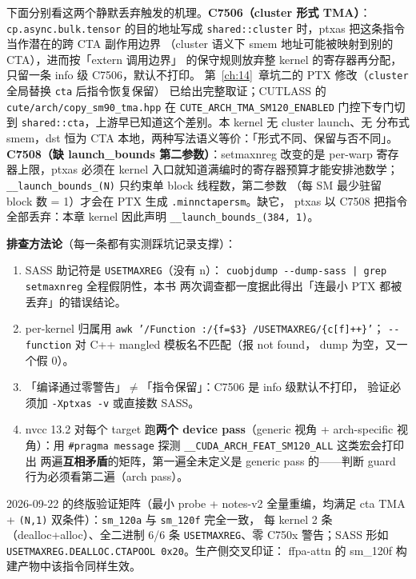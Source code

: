 下面分别看这两个静默丢弃触发的机理。\textbf{C7506（cluster 形式 TMA）}：
\texttt{cp.\allowbreak{}async.\allowbreak{}bulk.\allowbreak{}tensor} 的目的地址写成
\texttt{shared::cluster} 时，ptxas 把这条指令当作潜在的跨 CTA 副作用边界
（cluster 语义下 smem 地址可能被映射到别的 CTA），进而按「extern 调用边界」
的保守规则放弃整 kernel 的寄存器再分配，只留一条 info 级 C7506，默认不打印。
第~\ref{ch:14}~章坑二的 PTX 修改（\texttt{cluster} 全局替换 \texttt{cta} 后指令恢复保留）
已给出完整取证；CUTLASS 的 \texttt{cute/arch/copy\_sm90\_tma.hpp} 在
\texttt{CUTE\_\allowbreak{}ARCH\_\allowbreak{}TMA\_\allowbreak{}SM120\_\allowbreak{}ENABLED} 门控下专门切到
\texttt{shared::cta}，上游早已知道这个差别。本 kernel 无 cluster launch、无
分布式 smem，dst 恒为 CTA 本地，两种写法语义等价：「形式不同、保留与否不同」。
\textbf{C7508（缺 launch\_bounds 第二参数）}：setmaxnreg 改变的是 per-warp
寄存器上限，ptxas 必须在 kernel 入口就知道满编时的寄存器预算才能安排池数学；
\texttt{\_\_launch\_\allowbreak{}bounds\_\allowbreak{}(N)} 只约束单 block 线程数，第二参数
（每 SM 最少驻留 block 数 = 1）才会在 PTX 生成 \texttt{.minnctapersm}。缺它，
ptxas 以 C7508 把指令全部丢弃：本章 kernel 因此声明
\texttt{\_\_launch\_\allowbreak{}bounds\_\allowbreak{}(384,~1)}。

\textbf{排查方法论}（每一条都有实测踩坑记录支撑）：
\begin{enumerate}[itemsep=1pt,topsep=2pt]
  \item SASS 助记符是 \texttt{USETMAXREG}（没有 n）：
        \texttt{cuobjdump -{}-dump-sass | grep setmaxnreg} 全程假阴性，本书
        两次调查都一度据此得出「连最小 PTX 都被丢弃」的错误结论。
  \item per-kernel 归属用
        \texttt{awk '/Function :/\{f=\$3\} /USETMAXREG/\{c[f]++\}'}；
        \texttt{-{}-function} 对 C++ mangled 模板名不匹配（报 not found，
        dump 为空，又一个假 0）。
  \item 「编译通过零警告」$\neq$「指令保留」：C7506 是 info 级默认不打印，
        验证必须加 \texttt{-Xptxas -v} 或直接数 SASS。
  \item nvcc 13.2 对每个 target 跑\textbf{两个 device pass}（generic 视角 +
        arch-specific 视角）：用 \texttt{\#pragma message} 探测
        \texttt{\_\_CUDA\_ARCH\_FEAT\_\allowbreak{}SM120\_\allowbreak{}ALL} 这类宏会打印出
        两遍\textbf{互相矛盾}的矩阵，第一遍全未定义是 generic pass 的——判断
        guard 行为必须看第二遍（arch pass）。
\end{enumerate}

2026-09-22 的终版验证矩阵（最小 probe + notes-v2 全量重编，均满足
cta TMA + \texttt{(N,1)} 双条件）：\texttt{sm\_120a} 与 \texttt{sm\_120f} 完全一致，
每 kernel 2 条（dealloc+alloc）、全二进制 6/6 条 \texttt{USETMAXREG}、零 C750x
警告；SASS 形如 \texttt{USETMAXREG.DEALLOC.CTAPOOL 0x20}。生产侧交叉印证：
ffpa-attn 的 sm\_120f 构建产物中该指令同样生效。

